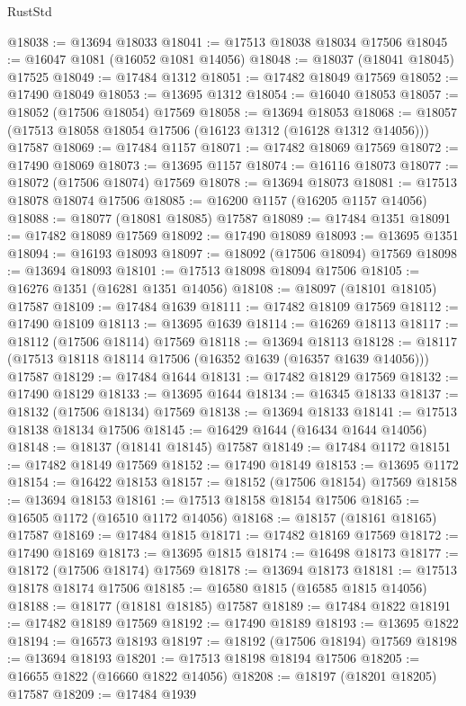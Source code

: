 \begin{lexlean}{RustStd}
\begin{coremodule}
@18038 := @13694 @18033
@18041 := @17513 @18038 @18034 @17506
@18045 := @16047 @1081 (@16052 @1081 @14056)
@18048 := @18037 (@18041 @18045) @17525
@18049 := @17484 @1312
@18051 := @17482 @18049 @17569
@18052 := @17490 @18049
@18053 := @13695 @1312
@18054 := @16040 @18053
@18057 := @18052 (@17506 @18054) @17569
@18058 := @13694 @18053
@18068 := @18057 (@17513 @18058 @18054 @17506 (@16123 @1312 (@16128 @1312 @14056))) @17587
@18069 := @17484 @1157
@18071 := @17482 @18069 @17569
@18072 := @17490 @18069
@18073 := @13695 @1157
@18074 := @16116 @18073
@18077 := @18072 (@17506 @18074) @17569
@18078 := @13694 @18073
@18081 := @17513 @18078 @18074 @17506
@18085 := @16200 @1157 (@16205 @1157 @14056)
@18088 := @18077 (@18081 @18085) @17587
@18089 := @17484 @1351
@18091 := @17482 @18089 @17569
@18092 := @17490 @18089
@18093 := @13695 @1351
@18094 := @16193 @18093
@18097 := @18092 (@17506 @18094) @17569
@18098 := @13694 @18093
@18101 := @17513 @18098 @18094 @17506
@18105 := @16276 @1351 (@16281 @1351 @14056)
@18108 := @18097 (@18101 @18105) @17587
@18109 := @17484 @1639
@18111 := @17482 @18109 @17569
@18112 := @17490 @18109
@18113 := @13695 @1639
@18114 := @16269 @18113
@18117 := @18112 (@17506 @18114) @17569
@18118 := @13694 @18113
@18128 := @18117 (@17513 @18118 @18114 @17506 (@16352 @1639 (@16357 @1639 @14056))) @17587
@18129 := @17484 @1644
@18131 := @17482 @18129 @17569
@18132 := @17490 @18129
@18133 := @13695 @1644
@18134 := @16345 @18133
@18137 := @18132 (@17506 @18134) @17569
@18138 := @13694 @18133
@18141 := @17513 @18138 @18134 @17506
@18145 := @16429 @1644 (@16434 @1644 @14056)
@18148 := @18137 (@18141 @18145) @17587
@18149 := @17484 @1172
@18151 := @17482 @18149 @17569
@18152 := @17490 @18149
@18153 := @13695 @1172
@18154 := @16422 @18153
@18157 := @18152 (@17506 @18154) @17569
@18158 := @13694 @18153
@18161 := @17513 @18158 @18154 @17506
@18165 := @16505 @1172 (@16510 @1172 @14056)
@18168 := @18157 (@18161 @18165) @17587
@18169 := @17484 @1815
@18171 := @17482 @18169 @17569
@18172 := @17490 @18169
@18173 := @13695 @1815
@18174 := @16498 @18173
@18177 := @18172 (@17506 @18174) @17569
@18178 := @13694 @18173
@18181 := @17513 @18178 @18174 @17506
@18185 := @16580 @1815 (@16585 @1815 @14056)
@18188 := @18177 (@18181 @18185) @17587
@18189 := @17484 @1822
@18191 := @17482 @18189 @17569
@18192 := @17490 @18189
@18193 := @13695 @1822
@18194 := @16573 @18193
@18197 := @18192 (@17506 @18194) @17569
@18198 := @13694 @18193
@18201 := @17513 @18198 @18194 @17506
@18205 := @16655 @1822 (@16660 @1822 @14056)
@18208 := @18197 (@18201 @18205) @17587
@18209 := @17484 @1939

\end{coremodule}
\end{lexlean}
